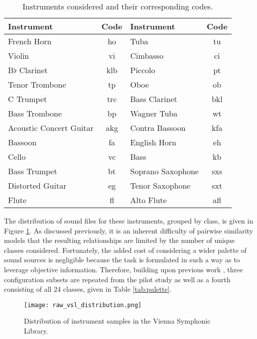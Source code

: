 \begin{table*}[t]
\begin{center}
\caption{Instruments considered and their corresponding codes.}
\begin{tabular}{l | c || l | c}
Instrument & Code & Instrument & Code \\
\hline
French Horn & ho & Tuba & tu\\
Violin & vi & Cimbasso & ci \\
B$\flat$ Clarinet & klb & Piccolo & pt \\
Tenor Trombone & tp & Oboe & ob \\
C Trumpet & trc & Bass Clarinet & bkl \\
Bass Trombone & bp & Wagner Tuba & wt \\
Acoustic Concert Guitar & akg & Contra Bassoon & kfa \\
Bassoon & fa & English Horn & eh \\
Cello & vc & Bass & kb \\
Bass Trumpet & bt & Soprano Saxophone & sxs \\
Distorted Guitar & eg & Tenor Saxophone & sxt \\
Flute & fl & Alto Flute & afl \\
\hline
\end{tabular}
\label{tab:all_insts}
\end{center}
\end{table*}


The distribution of sound files for these instruments, grouped by class, is given in Figure \ref{fig:c24_dist}.
As discussed previously, it is an inherent difficulty of pairwise similarity models that the resulting relationships are limited by the number of unique classes considered.
Fortunately, the added cost of considering a wider palette of sound sources is negligible because the task is formulated in such a way as to leverage objective information.
Therefore, building upon previous work \cite{Humphrey2011Nonlinear}, three configuration subsets are repeated from the pilot study as well as a fourth consisting of all 24 classes, given in Table \ref{tab:palette}.

\begin{figure}[t]
\centering
\texttt{[image: raw\_vsl\_distribution.png]}
\caption{Distribution of instrument samples in the Vienna Symphonic Library.}
\label{fig:c24_dist}
\end{figure}


